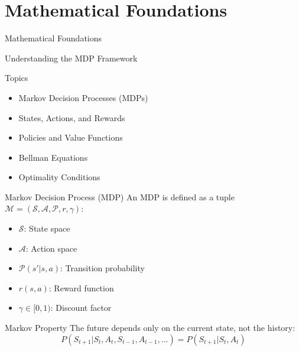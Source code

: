 \documentclass[aspectratio=169,10pt]{beamer}
\begin{document}
\section{Mathematical Foundations}

\begin{frame}{Mathematical Foundations}
\begin{center}
\Large{Understanding the MDP Framework}
\end{center}

\begin{block}{Topics}
\begin{itemize}
    \item Markov Decision Processes (MDPs)
    \item States, Actions, and Rewards
    \item Policies and Value Functions
    \item Bellman Equations
    \item Optimality Conditions
\end{itemize}
\end{block}
\end{frame}

\begin{frame}{Markov Decision Process (MDP)}
An MDP is defined as a tuple $\mathcal{M} = (\mathcal{S}, \mathcal{A}, \mathcal{P}, r, \gamma)$:

\begin{itemize}
    \item $\mathcal{S}$: State space
    \item $\mathcal{A}$: Action space
    \item $\mathcal{P}(s'|s,a)$: Transition probability
    \item $r(s,a)$: Reward function
    \item $\gamma \in [0,1)$: Discount factor
\end{itemize}

\begin{block}{Markov Property}
The future depends only on the current state, not the history:
$$P(S_{t+1}|S_t, A_t, S_{t-1}, A_{t-1}, ...) = P(S_{t+1}|S_t, A_t)$$
\end{block}
\end{frame}
\end{document}
